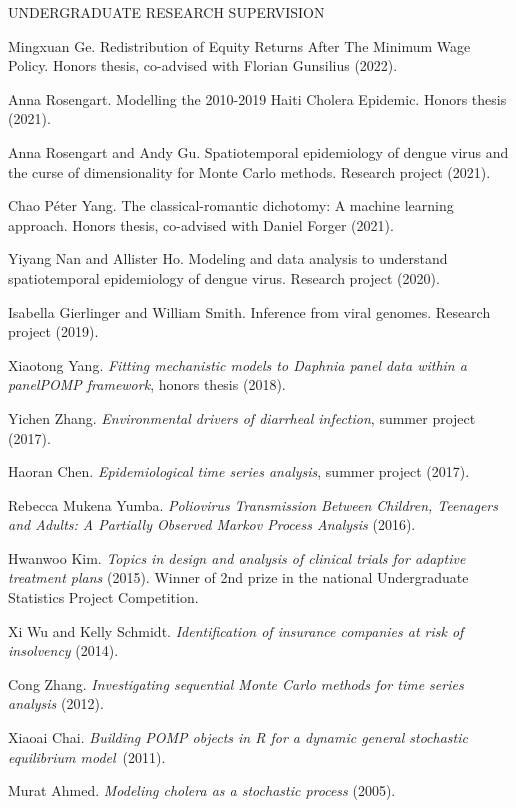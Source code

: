 \begin{reflist}{UNDERGRADUATE RESEARCH SUPERVISION}
\item{Mingxuan Ge}. Redistribution of Equity Returns After The Minimum Wage Policy. Honors thesis, co-advised with Florian Gunsilius (2022).
\item{Anna Rosengart}. Modelling the 2010-2019 Haiti Cholera Epidemic. Honors thesis (2021).
\item{Anna Rosengart and Andy Gu}. Spatiotemporal epidemiology of dengue virus and the curse of dimensionality for Monte Carlo methods. Research project (2021).
  \item{Chao P{\'e}ter Yang}. The classical-romantic dichotomy: A machine learning approach. Honors thesis, co-advised with Daniel Forger (2021).
  \item{Yiyang Nan and Allister Ho}. Modeling and data analysis to understand spatiotemporal epidemiology of dengue virus. Research project (2020).
  \item{Isabella Gierlinger and William Smith}. Inference from viral genomes. Research project (2019).
  \item{Xiaotong Yang}. {\em Fitting mechanistic models to Daphnia panel data within a panelPOMP framework}, honors thesis (2018).
\item{Yichen Zhang}. {\em Environmental drivers of diarrheal infection}, summer project (2017).
\item{Haoran Chen}. {\em Epidemiological time series analysis}, summer project (2017).
\item{Rebecca Mukena Yumba}.  {\em Poliovirus Transmission Between Children, Teenagers and Adults: A Partially Observed Markov Process Analysis} (2016).
\item{Hwanwoo Kim}. {\em Topics in design and analysis of clinical trials for adaptive treatment plans} (2015). Winner of 2nd prize in the national Undergraduate Statistics Project Competition.
\item{Xi Wu and Kelly Schmidt}. {\em Identification of insurance companies at risk of insolvency} (2014).
\item{Cong Zhang}. {\em Investigating sequential Monte Carlo methods for time series analysis} (2012).
\item{Xiaoai Chai}. {\em Building POMP objects in R for a dynamic general stochastic equilibrium model}~(2011).  
\item{Murat Ahmed}. {\em Modeling cholera as a stochastic process} (2005).

\end{reflist}



